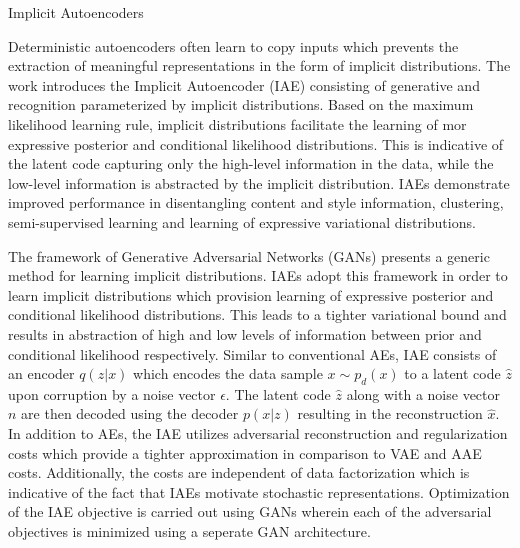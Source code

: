 \documentclass[11pt,letterpaper]{article}
\begin{document}
\begin{center}
  \large{Implicit Autoencoders}
\end{center}

Deterministic autoencoders often learn to copy inputs which prevents the extraction of meaningful representations in the form of implicit distributions. The work introduces the Implicit Autoencoder (IAE) consisting of generative and recognition parameterized by implicit distributions. Based on the maximum likelihood learning rule, implicit distributions facilitate the learning of mor expressive posterior and conditional likelihood distributions. This is indicative of the latent code capturing only the high-level information in the data, while the low-level information is abstracted by the implicit distribution. IAEs demonstrate improved performance in disentangling content and style information, clustering, semi-supervised learning and learning of expressive variational distributions. 

The framework of Generative Adversarial Networks (GANs) presents a generic method for learning implicit distributions. IAEs adopt this framework in order to learn implicit distributions which provision learning of expressive posterior and conditional likelihood distributions. This leads to a tighter variational bound and results in abstraction of high and low levels of information between prior and conditional likelihood respectively. Similar to conventional AEs, IAE consists of an encoder $q(z|x)$ which encodes the data sample $x \sim p_{d}(x)$ to a latent code $\hat{z}$ upon corruption by a noise vector $\epsilon$. The latent code $\hat{z}$ along with a noise vector $n$ are then decoded using the decoder $p(x|z)$ resulting in the reconstruction $\hat{x}$. In addition to AEs, the IAE utilizes adversarial reconstruction and regularization costs which provide a tighter approximation in comparison to VAE and AAE costs. Additionally, the costs are independent of data factorization which is indicative of the fact that IAEs motivate stochastic representations. Optimization of the IAE objective is carried out using GANs wherein each of the adversarial objectives is minimized using a seperate GAN architecture. 
\end{document}
